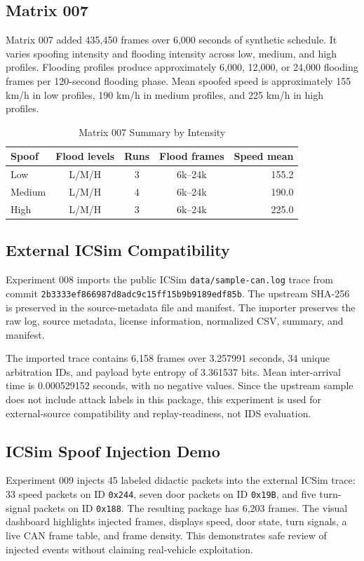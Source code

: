 \documentclass[conference]{IEEEtran}
\begin{document}
\subsection{Matrix 007}
Matrix 007 added 435,450 frames over 6,000 seconds of synthetic schedule. It varies spoofing intensity and flooding intensity across low, medium, and high profiles. Flooding profiles produce approximately 6,000, 12,000, or 24,000 flooding frames per 120-second flooding phase. Mean spoofed speed is approximately 155 km/h in low profiles, 190 km/h in medium profiles, and 225 km/h in high profiles.

\begin{table}[t]
\caption{Matrix 007 Summary by Intensity}
\label{tab:matrix}
\centering
\footnotesize
\begin{tabular}{lcccr}
\toprule
Spoof & Flood levels & Runs & Flood frames & Speed mean \\
\midrule
Low & L/M/H & 3 & 6k--24k & 155.2 \\
Medium & L/M/H & 4 & 6k--24k & 190.0 \\
High & L/M/H & 3 & 6k--24k & 225.0 \\
\bottomrule
\end{tabular}
\end{table}

\subsection{External ICSim Compatibility}
Experiment 008 imports the public ICSim \texttt{data/sample-can.log} trace from commit \texttt{2b3333ef866987d8adc9c15ff15b9b9189edf85b}. The upstream SHA-256 is preserved in the source-metadata file and manifest. The importer preserves the raw log, source metadata, license information, normalized CSV, summary, and manifest.

The imported trace contains 6,158 frames over 3.257991 seconds, 34 unique arbitration IDs, and payload byte entropy of 3.361537 bits. Mean inter-arrival time is 0.000529152 seconds, with no negative values. Since the upstream sample does not include attack labels in this package, this experiment is used for external-source compatibility and replay-readiness, not IDS evaluation.

\subsection{ICSim Spoof Injection Demo}
Experiment 009 injects 45 labeled didactic packets into the external ICSim trace: 33 speed packets on ID \texttt{0x244}, seven door packets on ID \texttt{0x19B}, and five turn-signal packets on ID \texttt{0x188}. The resulting package has 6,203 frames. The visual dashboard highlights injected frames, displays speed, door state, turn signals, a live CAN frame table, and frame density. This demonstrates safe review of injected events without claiming real-vehicle exploitation.
\end{document}

